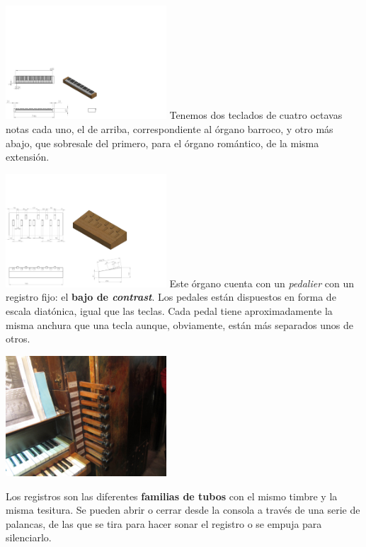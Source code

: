 \documentclass[10pt,a4paper]{article}
\begin{document}
	\begin{multicols}{2}
		\noindent
		\includegraphics[width=0.45\textwidth]{images/teclado_modelo} 
		\columnbreak
		Tenemos dos teclados de cuatro octavas notas cada uno, el de arriba, correspondiente al órgano barroco, y otro más abajo, que sobresale del primero, para el órgano romántico, de la misma extensión.
	\end{multicols}
	
	\begin{multicols}{2}
		\noindent
		\includegraphics[width=0.45\textwidth]{images/pedalier_modelo} 
		\columnbreak
		Este órgano cuenta con un \textit{pedalier} con un registro fijo: el \textbf{bajo de \textit{contrast}}. Los pedales están dispuestos en forma de escala diatónica, igual que las teclas. Cada pedal tiene aproximadamente la misma anchura que una tecla aunque, obviamente, están más separados unos de otros.
	\end{multicols}
	
	\begin{multicols}{2}
		\noindent
		\begin{center}
			\includegraphics[width=0.45\textwidth]{images/registros} 
		\end{center}
		\columnbreak
		Los registros son las diferentes \textbf{familias de tubos} con el mismo timbre y la misma tesitura. Se pueden abrir o cerrar desde la consola a través de una serie de palancas, de las que se tira para hacer sonar el registro o se empuja para silenciarlo.
	\end{multicols}
	
\end{document}

